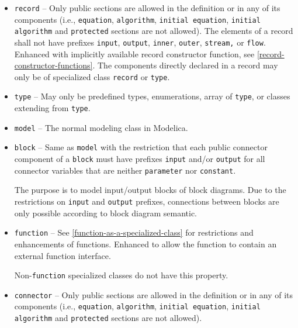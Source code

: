 \begin{itemize}
\item \lstinline!record! --
Only public sections are allowed in the definition or in any of its components (i.e., \lstinline!equation!, \lstinline!algorithm!, \lstinline!initial equation!, \lstinline!initial algorithm! and \lstinline!protected! sections are not allowed).
The elements of a record shall not have prefixes \lstinline!input!, \lstinline!output!, \lstinline!inner!, \lstinline!outer!, \lstinline!stream,! or \lstinline!flow!.
Enhanced with implicitly available record constructor function, see \cref{record-constructor-functions}.
The components directly declared in a record may only be of specialized class \lstinline!record! or \lstinline!type!.

\item \lstinline!type! --
May only be predefined types, enumerations, array of \lstinline!type!, or classes extending from \lstinline!type!.

\item \lstinline!model! --
The normal modeling class in Modelica.

\item \lstinline!block! --
Same as \lstinline!model! with the restriction that each public connector component of a \lstinline!block! must have prefixes \lstinline!input! and/or \lstinline!output! for all connector variables that are neither \lstinline!parameter! nor \lstinline!constant!.

\begin{nonnormative}
The purpose is to model input/output blocks of block diagrams.
Due to the restrictions on \lstinline!input! and \lstinline!output! prefixes, connections between blocks are only possible according to block diagram semantic.
\end{nonnormative}

\item \lstinline!function! --
See \cref{function-as-a-specialized-class} for restrictions and enhancements of functions.
Enhanced to allow the function to contain an external function interface.

\begin{nonnormative}
Non-\lstinline!function! specialized classes do not have this property.
\end{nonnormative}

\item \lstinline!connector! --
Only public sections are allowed in the definition or in any of its components (i.e., \lstinline!equation!, \lstinline!algorithm!, \lstinline!initial equation!, \lstinline!initial algorithm! and \lstinline!protected! sections are not allowed).


\end{itemize}
